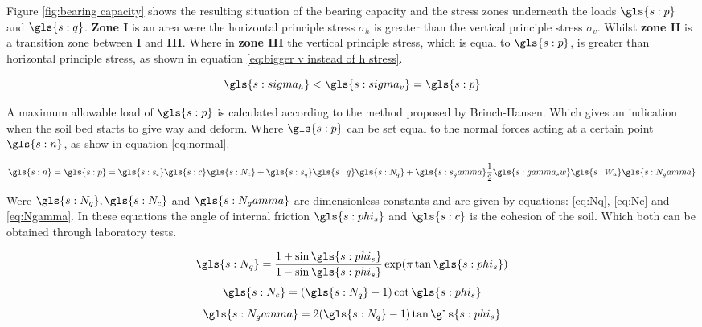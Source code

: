 Figure \ref{fig:bearing capacity} shows the resulting situation of the bearing capacity and the stress zones underneath the loads $ \gls{s:p} $ and $ \gls{s:q} $. \textbf{Zone I} is an area were the horizontal principle stress $ \sigma_h $ is greater than the vertical principle stress $ \sigma_v $. Whilst \textbf{zone II} is a transition zone between \textbf{I} and \textbf{III}. Where in \textbf{zone III} the vertical principle stress, which is equal to $ \gls{s:p} $, is greater than horizontal principle stress, as shown in equation \ref{eq:bigger v instead of h stress}.

\begin{sBox}
	\begin{equation}\label{eq:bigger v instead of h stress}
	\gls{s:sigma_h} < \gls{s:sigma_v} = \gls{s:p}
	\end{equation}
\end{sBox}

\noindent A maximum allowable load of $ \gls{s:p} $ is calculated according to the method proposed by Brinch-Hansen. Which gives an indication when the soil bed starts to give way and deform. Where $ \gls{s:p} $ can be set equal to the normal forces acting at a certain point $ \gls{s:n} $, as show in equation \ref{eq:normal}.

\begin{sBox}
	\begin{equation}\label{eq:Brinch-Hansen}
	\gls{s:n} = \gls{s:p} = \gls{s:s_c} \gls{s:c} \gls{s:N_c} + \gls{s:s_q} \gls{s:q} \gls{s:N_q} + \gls{s:s_gamma} \frac{1}{2} \gls{s:gamma_sw} \gls{s:W_a} \gls{s:N_gamma}
	\end{equation}
\end{sBox}

\noindent Were $ \gls{s:N_q}, \gls{s:N_c} $ and $ \gls{s:N_gamma} $ are dimensionless constants and are given by equations: \ref{eq:Nq}, \ref{eq:Nc} and \ref{eq:Ngamma}. In these equations the angle of internal friction $ \gls{s:phi_s} $ and $ \gls{s:c} $ is the cohesion of the soil. Which both can be obtained through laboratory tests.

\begin{sBox}
	\begin{equation}\label{eq:Nq}
	\gls{s:N_q} = \frac{1 + \sin \gls{s:phi_s}}{1 - \sin \gls{s:phi_s}} \exp(\pi \tan \gls{s:phi_s})
	\end{equation}
	\begin{equation}\label{eq:Nc}
		\gls{s:N_c} = (\gls{s:N_q} - 1)\cot \gls{s:phi_s}
	\end{equation}
	\begin{equation}\label{eq:Ngamma}
		\gls{s:N_gamma} = 2(\gls{s:N_q} - 1)\tan \gls{s:phi_s}
	\end{equation}
\end{sBox}


